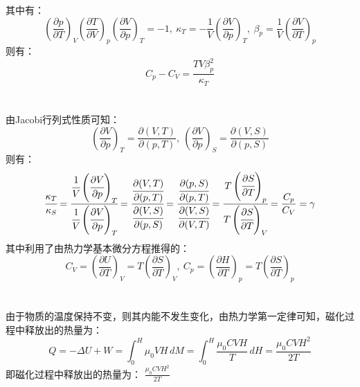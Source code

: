 \documentclass[a4paper,12pt]{article}
\begin{document}
其中有：
\begin{equation}\nonumber
	\left(\frac{\partial p}{\partial T}\right)_V\left(\frac{\partial T}{\partial V}\right)_p\left(\frac{\partial V}{\partial p}\right)_T = -1, ~ \kappa_T = -\frac{1}{V}\left(\frac{\partial V}{\partial p}\right)_T, ~ \beta_p=\frac{1}{V}\left(\frac{\partial V}{\partial T}\right)_p
\end{equation}
则有：
\begin{equation}\nonumber
	C_p-C_V = \frac{TV\beta_p^2}{\kappa_T}
\end{equation}

\section{}
由Jacobi行列式性质可知：
\begin{equation}\nonumber
	\left(\frac{\partial V}{\partial p}\right)_T = \frac{\partial (V,T)}{\partial (p,T)}, ~ \left(\frac{\partial V}{\partial p}\right)_S = \frac{\partial (V,S)}{\partial (p,S)}
\end{equation}
则有：
\begin{equation}\nonumber
	\cfrac{\kappa_T}{\kappa_S}=\cfrac{\cfrac{1}{V}\left(\cfrac{\partial V}{\partial p}\right)_T}{\cfrac{1}{V}\left(\cfrac{\partial V}{\partial p}\right)_T} = \cfrac{\cfrac{\partial (V,T)}{\partial (p,T)}}{\cfrac{\partial (V,S)}{\partial (p,S)}} = \cfrac{\cfrac{\partial (p,S)}{\partial (p,T)}}{\cfrac{\partial (V,S)}{\partial (V,T)}} = \cfrac{T\left(\cfrac{\partial S}{\partial T}\right)_p}{T\left(\cfrac{\partial S}{\partial T}\right)_V} = \frac{C_p}{C_V}=\gamma
\end{equation}
其中利用了由热力学基本微分方程推得的：
\begin{equation}\nonumber
	C_V=\left(\frac{\partial U}{\partial T}\right)_V = T\left(\frac{\partial S}{\partial T}\right)_V, ~ C_p=\left(\frac{\partial H}{\partial T}\right)_p = T\left(\frac{\partial S}{\partial T}\right)_p
\end{equation}

\section{}
由于物质的温度保持不变，则其内能不发生变化，由热力学第一定律可知，磁化过程中释放出的热量为：
\begin{equation}\nonumber
	Q = -\Delta U + W = \int_0^H \mu_0 V H\,dM = \int_0^H \frac{\mu_0 CVH}{T}\,dH = \frac{\mu_0 CVH^2}{2T}
\end{equation}
即磁化过程中释放出的热量为： $\frac{\mu_0 CVH^2}{2T}$
\end{document}
